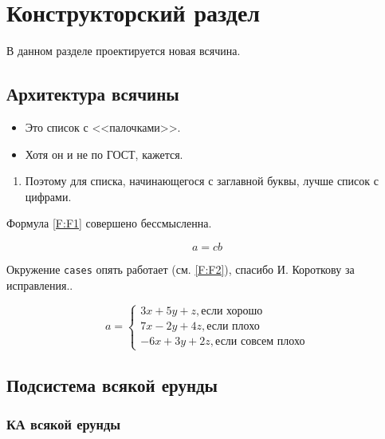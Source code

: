\documentclass[utf8]{G7-32} %
\begin{document}
\chapter{Конструкторский раздел}

В данном разделе проектируется новая всячина.

\section{Архитектура всячины}

\begin{itemize}
\item Это список с <<палочками>>.
\item Хотя он и не по ГОСТ, кажется.
\end{itemize}

\begin{enumerate}
\item Поэтому для списка, начинающегося с заглавной буквы, лучше список с цифрами.
\end{enumerate}

Формула \ref{F:F1} совершено бессмысленна.


\begin{equation}
a= cb
\label{F:F1}
\end{equation}


Окружение \texttt{cases} опять работает (см. \ref{F:F2}), спасибо И. Короткову за исправления..


\begin{equation}
a= \begin{cases}
 3x + 5y + z, \mbox{если хорошо} \\
 7x - 2y + 4z, \mbox{если плохо}\\
 -6x + 3y + 2z, \mbox{если совсем плохо}
\end{cases}
\label{F:F2}
\end{equation}

\section{Подсистема всякой ерунды}

\subsection{КА всякой ерунды}
\end{document}
